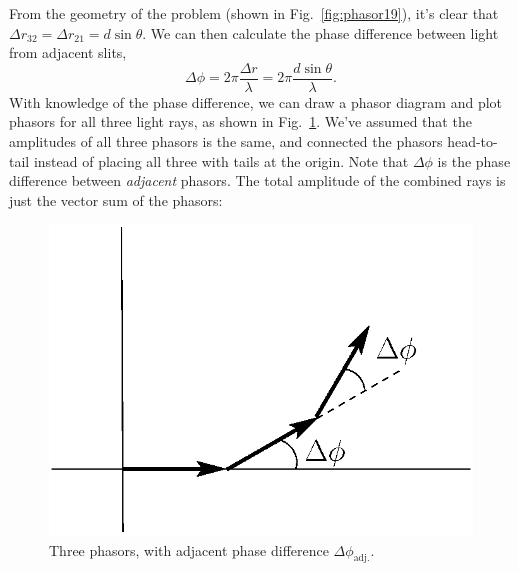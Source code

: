 From the geometry of the problem (shown in Fig.~\ref{fig:phasor19}), it's clear that $\Delta
r_{32} = \Delta r_{21} = d\sin{\theta}$. We can then calculate the
phase difference between light from adjacent slits,
\begin{equation}
\Delta \phi = 2\pi \frac{\Delta r}{\lambda}
= 2\pi \frac{d\sin{\theta}}{\lambda}.
\end{equation}
With knowledge of the phase difference, we can draw a phasor diagram
and plot phasors for all three light rays, as shown in Fig.~\ref{fig:phasor20}.
We've assumed that the amplitudes of all three phasors
is the same, and  connected the phasors head-to-tail instead of
placing all three with tails at the origin. Note that $\Delta\phi$ is
the phase difference between {\em adjacent} phasors. The total
amplitude of the combined rays is just the vector sum of the phasors:

\begin{figure}
\begin{center}
 \includegraphics[width=2.0truein]{phasors/phasor20} 
\caption{\label{fig:phasor20}Three phasors, with adjacent phase difference
$\Delta\phi_\text{adj.}$.}
\end{center}
\end{figure}

